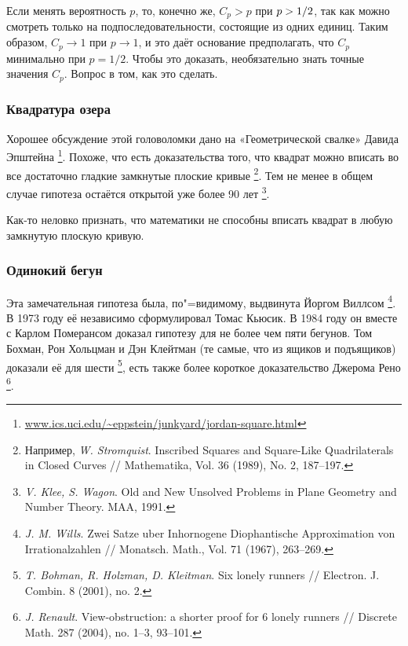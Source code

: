 \documentclass[twoside]{book}
\begin{document}
Если менять вероятность $p$, то, конечно же, $C_p>p$ при $p \z> 1/2$, так как можно смотреть только на подпоследовательности, состоящие из одних единиц.
Таким образом, $C_p\to 1$ при $p\to 1$, и это даёт основание предполагать, что $C_p$ минимально при $p=1/2$.
Чтобы это доказать, необязательно знать точные значения $C_p$.
Вопрос в том, как это сделать.

\subsubsection*{Квадратура озера}

Хорошее обсуждение этой головоломки дано на «Геометрической свалке» Давида Эпштейна%
\footnote{\href{http://www.ics.uci.edu/~eppstein/junkyard/jordan-square.html}{\url{www.ics.uci.edu/~eppstein/junkyard/jordan-square.html}}}.
Похоже, что есть доказательства того, что квадрат можно вписать во все достаточно гладкие замкнутые плоские кривые%
\footnote{Например, \emph{W. Stromquist}. Inscribed Squares and Square-Like Quadrilaterals in Closed Curves /\!/ {Mathematika}, Vol. 36 (1989), No. 2, 187--197.}.
Тем не менее в общем случае гипотеза остаётся открытой уже более 90 лет%
\footnote{\emph{V. Klee, S. Wagon}. {Old and New Unsolved Problems in Plane Geometry and Number Theory.} MAA, 1991.}.


Как-то неловко признать, что математики не способны вписать квадрат в любую замкнутую плоскую кривую.

\subsubsection*{Одинокий бегун}

Эта замечательная гипотеза была, по"=видимому, выдвинута Йоргом Виллсом%
\footnote{\emph{J. M. Wills}. Zwei Satze uber Inhornogene Diophantische Approximation von Irrational\-zahlen /\!/ {Monatsch. Math.}, Vol. 71 (1967), 263--269.}.
В 1973 году её независимо сформулировал Томас Кьюсик.
В 1984 году он вместе с Карлом Померансом доказал гипотезу для не более чем пяти бегунов.
Том Бохман, Рон Хольцман и Дэн Клейтман (те самые, что из ящиков и подъящиков) доказали её для шести%
\footnote{\emph{T. Bohman, R. Holzman, D. Kleitman}.
Six lonely runners /\!/ {Electron. J. Combin.} 8 (2001), no. 2.
},
есть также более короткое доказательство Джерома Рено%
\footnote{\emph{J. Renault}. View-obstruction: a shorter proof for 6 lonely runners /\!/ {Discrete Math.} 287 (2004), no. 1--3, 93--101.}.
\end{document}
